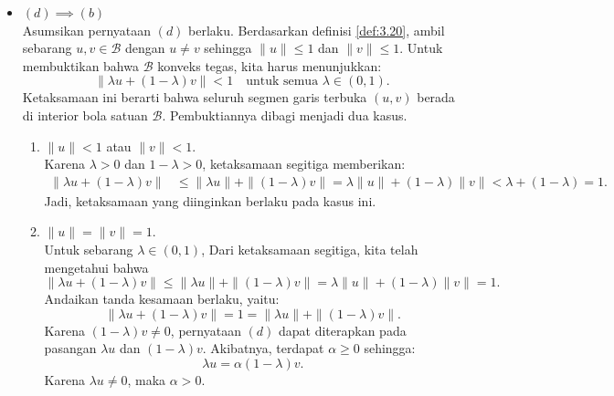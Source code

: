 \documentclass[aspectratio=169,11pt]{beamer}
\theoremstyle{definition}
\begin{document}
\begin{frame}[allowframebreaks]{\insertsection}{\insertsubsection}
\begin{itemize}
          Dengan menggabungkan kasus $u=0$ dan $u \neq 0$, pernyataan $(d)$ terbukti.
    \item $(d) \implies (b)$\\
          Asumsikan pernyataan $(d)$ berlaku. Berdasarkan definisi \ref{def:3.20}, ambil sebarang $u,v \in \mathcal{B}$ dengan $u \neq v$ sehingga $\|u\| \leq 1$ dan $\|v\| \leq 1$. Untuk membuktikan bahwa $\mathcal{B}$ konveks tegas, kita harus menunjukkan:
          \begin{equation*}
            \|\lambda u + (1-\lambda)v\| < 1 \quad \text{untuk semua } \lambda \in (0,1).
          \end{equation*}
          Ketaksamaan ini berarti bahwa seluruh segmen garis terbuka $(u,v)$ berada di interior bola satuan $\mathcal{B}$. Pembuktiannya dibagi menjadi dua kasus.

          \begin{enumerate}
            \item $\|u\| < 1$ atau $\|v\| < 1$.\\
                  Karena $\lambda > 0$ dan $1-\lambda > 0$, ketaksamaan segitiga memberikan:
                  \begin{align*}
                    \|\lambda u + (1-\lambda)v\|
                     & \leq \|\lambda u\| + \|(1-\lambda)v\|  = \lambda\|u\| + (1-\lambda)\|v\|    < \lambda + (1-\lambda) = 1.
                  \end{align*}
                  Jadi, ketaksamaan yang diinginkan berlaku pada kasus ini.

            \item $\|u\| = \|v\| = 1$.\\
                  Untuk sebarang $\lambda \in (0,1)$, Dari ketaksamaan segitiga, kita telah mengetahui bahwa
                  \begin{equation*}
                    \|\lambda u + (1-\lambda)v\| \leq\|\lambda u\| + \|(1-\lambda)v\|
                    = \lambda\|u\| + (1-\lambda)\|v\| = 1.
                  \end{equation*}
                  Andaikan tanda kesamaan berlaku, yaitu:
                  \begin{equation*}
                    \|\lambda u + (1-\lambda)v\| = 1
                    = \|\lambda u\| + \|(1-\lambda)v\|.
                  \end{equation*}
                  Karena $(1-\lambda)v \neq 0$, pernyataan $(d)$ dapat diterapkan pada pasangan $\lambda u$ dan $(1-\lambda)v$. Akibatnya, terdapat $\alpha \geq 0$ sehingga:
                  \begin{equation*}
                    \lambda u = \alpha(1-\lambda)v.
                  \end{equation*}
                  Karena $\lambda u \neq 0$, maka $\alpha > 0$.



\end{enumerate}
\end{itemize}
\end{frame}
\end{document}

